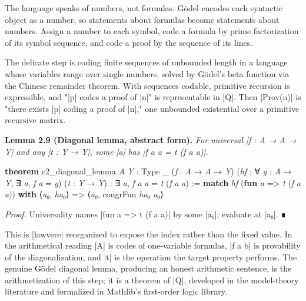 \documentclass{memoir}
\begin{document}
The language speaks of numbers, not formulas. Gödel encodes each syntactic
object as a number, so statements about formulas become statements about
numbers. Assign a number to each symbol, code a formula by prime factorization
of its symbol sequence, and code a proof by the sequence of its lines.

The delicate step is coding finite sequences of unbounded length in a language
whose variables range over single numbers, solved by Gödel's beta function via
the Chinese remainder theorem. With sequences codable, primitive recursion is
expressible, and "\LeanVerb|p| codes a proof of \LeanVerb|n|" is representable in \LeanVerb|Q|. Then
\LeanVerb|Prov(n)| is "there exists \LeanVerb|p| coding a proof of \LeanVerb|n|," one unbounded existential
over a primitive recursive matrix.

\textbf{Lemma 2.9 (Diagonal lemma, abstract form).} \emph{For universal \LeanVerb|f : A → A → Y| and any
\LeanVerb|t : Y → Y|, some \LeanVerb|a| has \LeanVerb|f a a = t (f a a)|.}

\begin{LeanVerbatim}
\textbf{theorem} c2_diagonal_lemma \textit{A} \textit{Y} : Type _ (\textit{f} : \textit{A} → \textit{A} → \textit{Y})
    (\textit{hf} : ∀ \textit{g} : \textit{A} → \textit{Y}, ∃ \textit{a}, \textit{f} \textit{a} = \textit{g}) (\textit{t} : \textit{Y} → \textit{Y}) :
    ∃ \textit{a}, \textit{f} \textit{a} \textit{a} = \textit{t} (\textit{f} \textit{a} \textit{a}) :=
  \textbf{match} \textit{hf} (\textbf{fun} \textit{a} => \textit{t} (\textit{f} \textit{a} \textit{a})) \textbf{with}
   ⟨\textit{a₀}, \textit{ha₀}⟩ => ⟨\textit{a₀}, congrFun \textit{ha₀} \textit{a₀}⟩

\end{LeanVerbatim}


\emph{Proof.} Universality names \LeanVerb|fun a => t (f a a)| by some \LeanVerb|a₀|; evaluate at \LeanVerb|a₀|. ∎

This is \LeanVerb|lawvere| reorganized to expose the index rather than the fixed
value. In the arithmetical reading \LeanVerb|A| is codes of one-variable formulas, \LeanVerb|f a b|
is provability of the diagonalization, and \LeanVerb|t| is the operation the target
property performs. The genuine Gödel diagonal lemma, producing an honest
arithmetic sentence, is the arithmetization of this step; it is a theorem of
\LeanVerb|Q|, developed in the model-theory literature and formalized in Mathlib's
first-order logic library.
\end{document}
